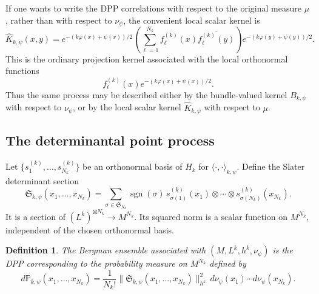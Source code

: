 \documentclass[12pt,a4paper,reqno]{article}
\theoremstyle{thmstyleone}
\theoremstyle{thmstylethree}
\newtheorem{definition}[theorem]{Definition}
\theoremstyle{thmstyletwo}
\numberwithin{equation}{subsection}
\begin{document}
If one wants to write the DPP correlations with respect to the original measure $\mu$, rather than with respect to $\nu_\psi$, the convenient local scalar kernel is
\[
    \widehat K_{k,\psi}(x,y)
    =
    e^{-(k\varphi(x)+\psi(x))/2}
    \left(
        \sum_{\ell=1}^{N_k}
        f_\ell^{(k)}(x)\overline{f_\ell^{(k)}(y)}
    \right)
    e^{-(k\varphi(y)+\psi(y))/2}.
\]
This is the ordinary projection kernel associated with the local orthonormal functions
\[
    f_\ell^{(k)}(x)e^{-(k\varphi(x)+\psi(x))/2}.
\]
Thus the same process may be described either by the bundle-valued kernel $B_{k,\psi}$ with respect to $\nu_\psi$, or by the local scalar kernel $\widehat K_{k,\psi}$ with respect to $\mu$.

\subsection{The determinantal point process}

Let $\{s_1^{(k)},\ldots,s_{N_k}^{(k)}\}$ be an orthonormal basis of $H_k$ for $\langle\cdot,\cdot\rangle_{k,\psi}$. Define the Slater determinant section
\begin{equation}\label{eq:Slater}
\mathfrak S_{k,\psi}(x_1,\ldots,x_{N_k})
    =
    \sum_{\sigma\in\mathfrak S_{N_k}}
    \operatorname{sgn}(\sigma)\,
    s_{\sigma(1)}^{(k)}(x_1)\otimes\cdots\otimes
    s_{\sigma(N_k)}^{(k)}(x_{N_k}).
\end{equation}
It is a section of $(L^k)^{\boxtimes N_k}\longrightarrow M^{N_k}.$ Its squared norm is a scalar function on $M^{N_k}$, independent of the chosen orthonormal basis.

\begin{definition}
\label{def:Bergman-DPP}
The \emph{Bergman ensemble} associated with $(M,L^k,h^k,\nu_\psi)$ is the DPP corresponding to the probability measure on $M^{N_k}$ defined by
\[
    d\mathbb P_{k,\psi}(x_1,\ldots,x_{N_k})
    =
    \frac{1}{N_k!}
    \big\|
        \mathfrak S_{k,\psi}(x_1,\ldots,x_{N_k})
    \big\|_{h^k}^{2}
    \,d\nu_\psi(x_1)\cdots d\nu_\psi(x_{N_k}).
\]
\end{definition}
\end{document}
